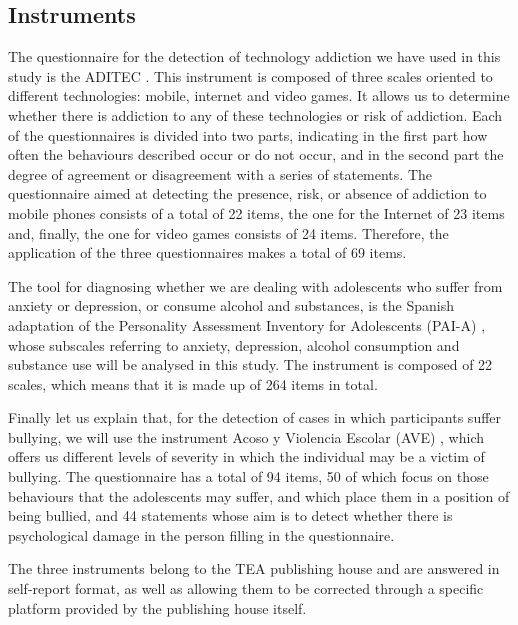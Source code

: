\documentclass[english]{textolivre}
\begin{document}
\subsection{Instruments}\label{sec-instr}
The questionnaire for the detection of technology addiction we have used in this study is the ADITEC \cite{choliz2016aditec}. %
This instrument is composed of three scales oriented to different technologies: mobile, internet and video games. It allows us to determine whether there is addiction to any of these technologies or risk of addiction. Each of the questionnaires is divided into two parts, indicating in the first part how often the behaviours described occur or do not occur, and in the second part the degree of agreement or disagreement with a series of statements. The questionnaire aimed at detecting the presence, risk, or absence of addiction to mobile phones consists of a total of 22 items, the one for the Internet of 23 items and, finally, the one for video games consists of 24 items. Therefore, the application of the three questionnaires makes a total of 69 items.

The tool for diagnosing whether we are dealing with adolescents who suffer from anxiety or depression, or consume alcohol and substances, is the Spanish adaptation of the Personality Assessment Inventory for Adolescents (PAI-A) \cite{cardenal2018}, %
whose subscales referring to anxiety, depression, alcohol consumption and substance use will be analysed in this study. The instrument is composed of 22 scales, which means that it is made up of 264 items in total.

Finally let us explain that, for the detection of cases in which participants suffer bullying, we will use the instrument Acoso y Violencia Escolar (AVE) \cite{pinuel2006ave}, %
which offers us different levels of severity in which the individual may be a victim of bullying. The questionnaire has a total of 94 items, 50 of which focus on those behaviours that the adolescents may suffer, and which place them in a position of being bullied, and 44 statements whose aim is to detect whether there is psychological damage in the person filling in the questionnaire.

The three instruments belong to the TEA publishing house and are answered in self-report format, as well as allowing them to be corrected through a specific platform provided by the publishing house itself.
\end{document}
